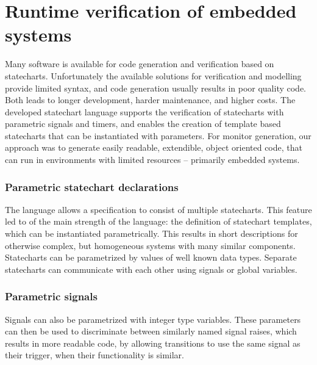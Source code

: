 \chapter{Runtime verification of embedded systems}
\label{chap:runtime_verification}
Many software is available for code generation and verification based on statecharts. Unfortunately the available solutions for verification and modelling provide limited syntax, and code generation usually results in poor quality code. Both leads to longer development, harder maintenance, and higher costs. The developed statechart language supports the verification of statecharts with parametric signals and timers, and enables the creation of template based statecharts that can be instantiated with parameters. For monitor generation, our approach was to generate easily readable, extendible, object oriented code, that can run in environments with limited resources -- primarily embedded systems.
  \subsection{Parametric statechart declarations}
The language allows a specification to consist of multiple statecharts. This feature led to of the main strength of the language: the definition of statechart templates, which can be instantiated parametrically. This results in short descriptions for otherwise complex, but homogeneous systems with many similar components. Statecharts can be parametrized by values of well known data types. Separate statecharts can communicate with each other using signals or global variables.
  \subsection{Parametric signals}
Signals can also be parametrized with integer type variables. These parameters can then be used to discriminate between similarly named signal raises, which results in more readable code, by allowing transitions to use the same signal as their trigger, when their functionality is similar.
